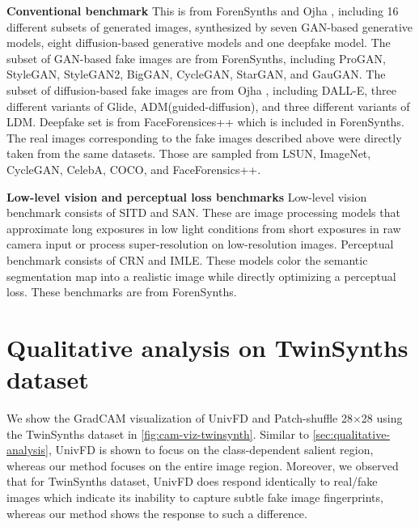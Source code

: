 \textbf{Conventional benchmark} 
This is from ForenSynths\cite{wang2020cnn} and Ojha \etal\cite{ojha2023towards}, including 16 different subsets of generated images, synthesized by seven GAN-based generative models, eight diffusion-based generative models and one deepfake model. 
The subset of GAN-based fake images are from ForenSynths\cite{wang2020cnn}, including ProGAN\cite{karras2018progressive}, StyleGAN\cite{karras2019style}, StyleGAN2\cite{Karras2019stylegan2}, BigGAN\cite{brock2018biggan}, CycleGAN\cite{CycleGAN}, StarGAN\cite{choi2018stargan}, and GauGAN\cite{GauGAN}.
The subset of diffusion-based fake images are from Ojha \etal\cite{ojha2023towards}, including DALL-E\cite{dayma2021dall}, three different variants of Glide\cite{nichol2021glide}, ADM(guided-diffusion)\cite{dhariwal2021diffusion}, and three different variants of LDM\cite{rombach2022high}.
Deepfake set is from FaceForensices++\cite{Deepfake} which is included in ForenSynths\cite{wang2020cnn}.
The real images corresponding to the fake images described above were directly taken from the same datasets. Those are sampled from LSUN\cite{yu2015lsun}, ImageNet\cite{russakovsky2015imagenet}, CycleGAN\cite{CycleGAN}, CelebA\cite{CelebA}, COCO\cite{coco}, and FaceForensics++\cite{Deepfake}.


\textbf{Low-level vision and perceptual loss benchmarks} 
Low-level vision benchmark consists of SITD\cite{chen2018SITD} and SAN\cite{dai2019SAN}.
These are image processing models that approximate long exposures in low light conditions from short exposures in raw camera input or process super-resolution on low-resolution images.
Perceptual benchmark consists of CRN\cite{chen2017CRN} and IMLE\cite{li2019IMLE}.
These models color the semantic segmentation map into a realistic image while directly optimizing a perceptual loss.
These benchmarks are from ForenSynths\cite{wang2020cnn}.



\section{Qualitative analysis on TwinSynths dataset}
We show the GradCAM visualization of UnivFD\cite{ojha2023towards} and Patch-shuffle 28×28 using the TwinSynths dataset in \cref{fig:cam-viz-twinsynth}.
Similar to \cref{sec:qualitative-analysis}, UnivFD is shown to focus on the class-dependent salient region, whereas our method focuses on the entire image region. 
Moreover, we observed that for TwinSynths dataset, UnivFD does respond identically to real/fake images which indicate its inability to capture subtle fake image fingerprints, whereas our method shows the response to such a difference. 


